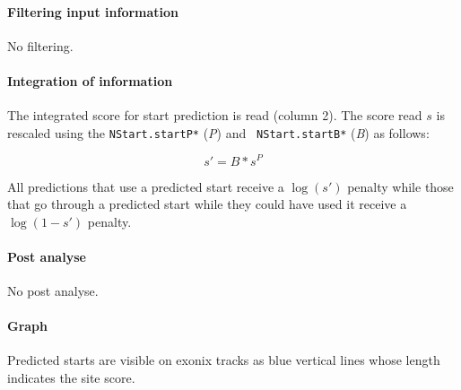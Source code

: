 \paragraph{Filtering input information}

No filtering.

\paragraph{Integration of information}

The integrated score for start prediction is read (column 2).  The
score read $s$ is rescaled using the {\tt NStart.startP*} (\emph{P}) and {\tt
NStart.startB*} (\emph{B}) as follows:

\[s' = B*s^P\]

All predictions that use a predicted start receive a $\log(s')$
penalty while those that go through a predicted start while they
could have used it receive a $\log(1-s')$ penalty.


\paragraph{Post analyse}

No post analyse.

\paragraph{Graph}

Predicted starts are visible on exonix tracks as blue vertical lines
whose length indicates the site score.






